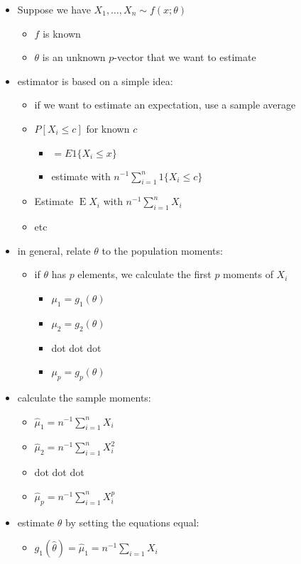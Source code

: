 \documentclass[11pt]{article}
\DeclareMathOperator{\E}{E}
\begin{document}
\begin{itemize}
\item Suppose we have $X_1,\dots,X_n \sim f(x; \theta)$
\begin{itemize}
\item $f$ is known
\item $\theta$ is an unknown $p$-vector that we want to estimate
\end{itemize}
\item estimator is based on a simple idea:
\begin{itemize}
\item if we want to estimate an expectation, use a sample average
\item $P[X_i \leq c]$ for known $c$
\begin{itemize}
\item $=E 1\{X_i \leq x\}$
\item estimate with $n^{-1} \sum_{i=1}^n 1\{X_i \leq c\}$
\end{itemize}
\item Estimate $\E X_i$ with $n^{-1} \sum_{i=1}^n X_i$
\item etc
\end{itemize}
\item in general, relate $\theta$ to the population moments:
\begin{itemize}
\item if $\theta$ has $p$ elements, we calculate the first $p$ moments
        of $X_i$
\begin{itemize}
\item $\mu_1 = g_1(\theta)$
\item $\mu_2 = g_2(\theta)$
\item dot dot dot
\item $\mu_p = g_p(\theta)$
\end{itemize}
\end{itemize}
\item calculate the sample moments:
\begin{itemize}
\item $\hat \mu_1 = n^{-1}\sum_{i=1}^n X_i$
\item $\hat \mu_2 = n^{-1}\sum_{i=1}^n X_i^2$
\item dot dot dot
\item $\hat \mu_p = n^{-1}\sum_{i=1}^n X_i^p$
\end{itemize}
\item estimate $\theta$ by setting the equations equal:
\begin{itemize}
\item $g_1(\hat\theta) = \hat\mu_1 = n^{-1}\sum_{i=1} X_i$

\end{itemize}
\end{itemize}
\end{document}
